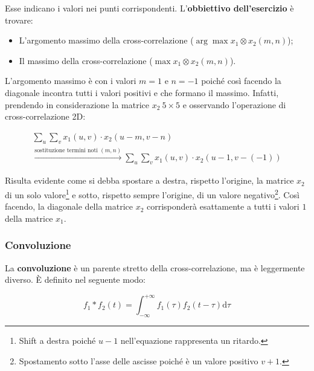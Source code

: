 \documentclass[a4paper]{article}
\begin{document}
	\noindent
	Esse indicano i valori nei punti corrispondenti. L'\textbf{obbiettivo dell'esercizio} è trovare:
	
	\begin{itemize}
		\item L'argomento massimo della cross-correlazione ($\arg \max x_{1} \otimes x_{2}\left(m,n\right)$);
		
		\item Il massimo della cross-correlazione ($\max x_{1} \otimes x_{2} \left(m,n\right)$).
	\end{itemize}

	\noindent
	L'argomento massimo è con i valori $m = 1$ e $n = -1$ poiché così facendo la diagonale incontra tutti i valori positivi e che formano il massimo. Infatti, prendendo in considerazione la matrice $x_{2}\:5 \times 5$ e osservando l'operazione di cross-correlazione 2D:
	
	\begin{gather*}
		\sum_{u} \sum_{v} x_{1} \left(u,v\right) \cdot x_{2}\left(u - m, v - n\right) \\
		\xrightarrow{\text{sostituzione termini noti } (m, n)} \sum_{u} \sum_{v} x_{1} \left(u,v\right) \cdot x_{2}\left(u - 1, v - \left(-1\right)\right)
	\end{gather*}

	\noindent
	Risulta evidente come si debba spostare a destra, rispetto l'origine, la matrice $x_{2}$ di un solo valore\footnote{Shift a destra poiché $u-1$ nell'equazione rappresenta un ritardo.} e sotto, rispetto sempre l'origine, di un valore negativo\footnote{Spostamento sotto l'asse delle ascisse poiché è un valore positivo $v+1$.}. Così facendo, la diagonale della matrice $x_{2}$ corrisponderà esattamente a tutti i valori $1$ della matrice $x_{1}$.

	\newpage
	
	\subsubsection{Convoluzione}
	
	La \textbf{convoluzione} è un parente stretto della cross-correlazione, ma è leggermente diverso. È definito nel seguente modo:
	
	\begin{equation*}
		f_{1} * f_{2}\left(t\right) = \int_{-\infty}^{+\infty} f_{1}\left(\tau\right) f_{2}\left(t - \tau\right) \mathrm{d}\tau
	\end{equation*}
\end{document}
